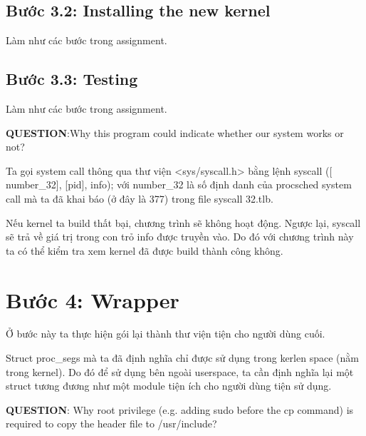 \subsection{Bước 3.2: Installing the new kernel}

Làm như các bước trong assignment.

\subsection{Bước 3.3: Testing}

Làm như các bước trong assignment.

\vspace{0.2cm}

\textbf{QUESTION}:Why this program could indicate whether our system works or not?

\vspace{0.2cm}

Ta gọi system call thông qua thư viện <sys/syscall.h> bằng lệnh syscall ([ number\_32], [pid], info);  với  number\_32  là số định danh của  procsched system call mà ta đã khai báo (ở đây là 377) trong file  syscall 32.tlb.

Nếu kernel ta build thất bại, chương trình sẽ không hoạt động. Ngược lại, syscall sẽ trả về giá trị trong con trỏ info được truyền vào. Do đó với chương trình này ta có thể kiểm tra xem kernel đã được build thành công không.



\section{Bước 4: Wrapper}

Ở bước này ta thực hiện gói lại thành thư viện tiện cho người dùng cuối.

\vspace{0.2cm}


\vspace{0.2cm}

Struct proc\_segs mà ta đã định nghĩa chỉ được sử dụng trong kerlen space (nằm trong kernel). Do đó để sử dụng bên ngoài userspace, ta cần định nghĩa lại một struct tương đương như một module tiện ích cho người dùng tiện sử dụng.

\vspace{0.3cm}

\textbf{QUESTION}: Why root privilege (e.g. adding sudo before the cp command) is required to copy the header file to /usr/include?

